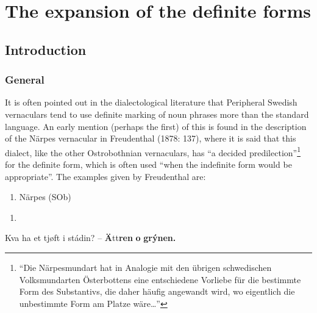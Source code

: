 \section[The expansion of the definite forms]{\rmfamily The expansion of the definite forms}
\label{bkm:Ref155077895}\label{bkm:Ref156803843}\label{bkm:Ref160007852}\subsection[Introduction]{\rmfamily Introduction}
\subsubsection[General]{\rmfamily General}
It is often pointed out in the dialectological literature that Peripheral Swedish vernaculars tend to use definite marking of noun phrases more than the standard language. An early mention (perhaps the first) of this is found in the description of the Närpes vernacular in Freudenthal (1878: 137), where it is said that this dialect, like the other Ostrobothnian vernaculars, has “a decided predilection”\footnote{ “Die Närpesmundart hat in Analogie mit den übrigen schwedischen Volksmundarten Österbottens eine entschiedene Vorliebe für die bestimmte Form des Substantivs, die daher häufig angewandt wird, wo eigentlich die unbestimmte Form am Platze wäre…”} for the definite form, which is often used “when the indefinite form would be appropriate”. The examples given by Freudenthal are:

\begin{enumerate} %
\item 
Närpes (SOb)

\end{enumerate} %
\begin{enumerate} %
\item 
\end{enumerate} %
\ea\label{}
\gll Kva  ha  et  tjøft  i  stádin?  –  \textbf{Ä}tt\textbf{ren} \textbf{o} \textbf{grýnen.}\\


